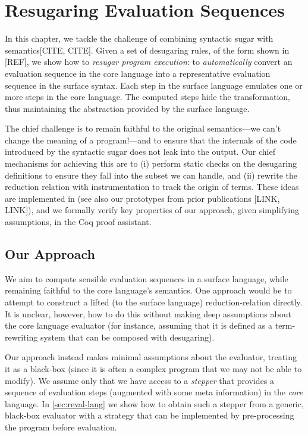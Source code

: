 
\chapter{Resugaring Evaluation Sequences}\label{chap:resugar-eval}

In this chapter, we tackle the challenge of combining syntactic sugar
with semantics[CITE, CITE]. Given a set of desugaring rules, of the
form shown in [REF], we show how to \emph{resugar program execution}:
to \emph{automatically} convert an evaluation sequence in the core
language into a representative evaluation sequence in the surface
syntax. Each step in the surface language emulates one or more steps
in the core language. The computed steps hide the transformation, thus
maintaining the abstraction provided by the surface language.

The chief challenge is to remain faithful to the original
semantics---we can't change the meaning of a program!---and to ensure
that the internals of the code introduced by the syntactic sugar does
not leak into the output. Our chief mechanisms for achieving this are
to (i) perform static checks on the desugaring definitions to ensure
they fall into the subset we can handle, and (ii) rewrite the
reduction relation with instrumentation to track the origin of terms.
These ideas are implemented in \Tool [LINK] (see also our prototypes from
prior publications [LINK, LINK]), and we formally verify key properties
of our approach, given simplifying assumptions, in the Coq proof
assistant.


\section{Our Approach}

We aim to compute sensible evaluation sequences in a surface language,
while remaining faithful to the core language's semantics.  One approach
would be to attempt to construct a lifted (to the surface language)
reduction-relation directly. It is unclear, however, how to do this
without making deep assumptions about the core language evaluator
(for instance, assuming that it is defined as a term-rewriting system that can be composed
with desugaring).

Our approach instead makes minimal assumptions about the
evaluator, treating it as a black-box (since it is often a complex
program that we may not be able to modify).
We assume only that we have access to a \emph{stepper} that
provides a sequence of evaluation steps (augmented with some
meta information) in the \emph{core} language. In 
\cref{sec:reval-lang} we show how to obtain such a stepper from a generic,
black-box
evaluator with a strategy that can be implemented by pre-processing
the program before evaluation.

